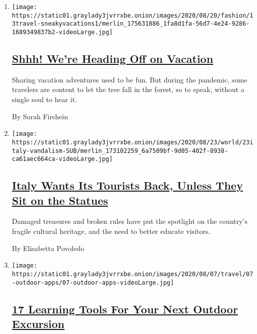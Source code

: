 \begin{enumerate}
\def\labelenumi{\arabic{enumi}.}
\item
  \texttt{[image: https://static01.graylady3jvrrxbe.onion/images/2020/08/20/fashion/13travel-sneakyvacations1/merlin\_175631886\_1fa8d1fa-56d7-4e24-9286-1689349837b2-videoLarge.jpg]}

  \hypertarget{shhh-were-heading-off-on-vacation}{%
  \subsection{\texorpdfstring{\href{/2020/08/14/travel/virus-secret-vacations.html}{Shhh!
  We're Heading Off on
  Vacation}}{Shhh! We're Heading Off on Vacation}}\label{shhh-were-heading-off-on-vacation}}

  Sharing vacation adventures used to be fun. But during the pandemic,
  some travelers are content to let the tree fall in the forest, so to
  speak, without a single soul to hear it.

  By Sarah Firshein
\item
  \texttt{[image: https://static01.graylady3jvrrxbe.onion/images/2020/08/23/world/23italy-vandalism-SUB/merlin\_173102259\_6a7509bf-9d05-402f-8938-ca61aec664ca-videoLarge.jpg]}

  \hypertarget{italy-wants-its-tourists-back-unless-they-sit-on-the-statues}{%
  \subsection{\texorpdfstring{\href{/2020/08/19/world/europe/italy-vandalism-tourism.html}{Italy
  Wants Its Tourists Back, Unless They Sit on the
  Statues}}{Italy Wants Its Tourists Back, Unless They Sit on the Statues}}\label{italy-wants-its-tourists-back-unless-they-sit-on-the-statues}}

  Damaged treasures and broken rules have put the spotlight on the
  country's fragile cultural heritage, and the need to better educate
  visitors.

  By Elisabetta Povoledo
\item
  \texttt{[image: https://static01.graylady3jvrrxbe.onion/images/2020/08/07/travel/07-outdoor-apps/07-outdoor-apps-videoLarge.jpg]}

  \hypertarget{17-learning-tools-for-your-next-outdoor-excursion}{%
  \subsection{\texorpdfstring{\href{/2020/08/11/travel/outdoors-apps-podcasts.html}{17
  Learning Tools For Your Next Outdoor
  Excursion}}{17 Learning Tools For Your Next Outdoor Excursion}}\label{17-learning-tools-for-your-next-outdoor-excursion}}


\end{enumerate}
